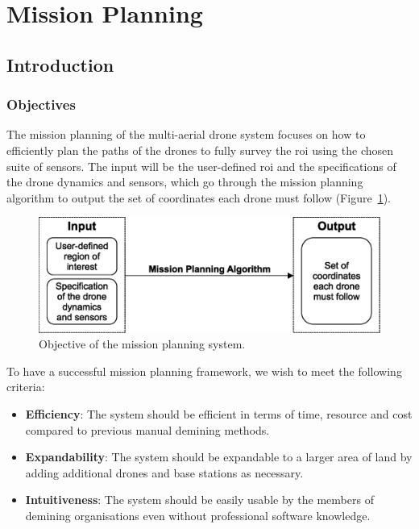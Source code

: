 \newpage
{}
\section{Mission Planning} \label{sec:msp}

\subsection{Introduction}
\label{sec:msp_introduction}

\subsubsection{Objectives}
\label{sec:msp_objectives}

The mission planning of the multi-aerial drone system focuses on how to efficiently plan the paths of the drones to fully survey the \gls{roi} using the chosen suite of sensors. The input will be the user-defined \gls{roi} and the specifications of the drone dynamics and sensors, which go through the mission planning algorithm to output the set of coordinates each drone must follow (Figure~\ref{fig:msp_objective}).

\begin{figure}[h!]
    \centering
    \includegraphics[width=0.7\linewidth]{figs/Jihwan/Objective of the Mission Planning System.eps}
    \caption[Objective of the Mission Planning System]
    {Objective of the mission planning system.}
    \label{fig:msp_objective}
\end{figure}

To have a successful mission planning framework, we wish to meet the following criteria:

\begin{itemize}
    \item \textbf{Efficiency}: The system should be efficient in terms of time, resource and cost compared to previous manual demining methods. 
    \item \textbf{Expandability}: The system should be expandable to a larger area of land by adding additional drones and base stations as necessary. 
    \item \textbf{Intuitiveness}: The system should be easily usable by the members of demining organisations even without professional software knowledge. 
\end{itemize}

